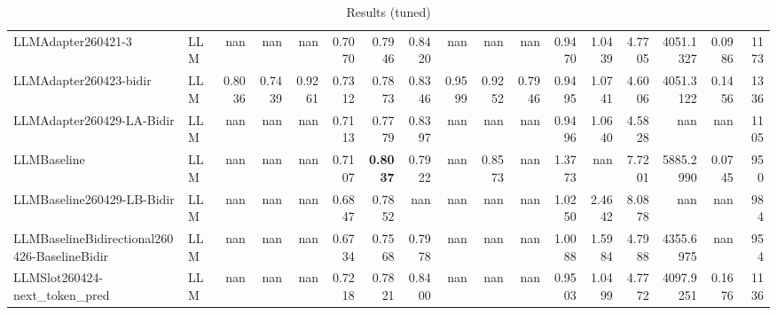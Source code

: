 \begin{table}[htbp]
{\begin{tabular}{ll|rrrrrrrrrrrrrr|r}
LLMAdapter260421-3 & LLM & nan & nan & nan & 0.7070 & 0.7946 & 0.8420 & nan & nan & nan & 0.9470 & 1.0439 & 4.7705 & 4051.1327 & 0.0986 & 1173 \\
LLMAdapter260423-bidir & LLM & 0.8036 & 0.7439 & 0.9261 & 0.7312 & 0.7873 & 0.8346 & 0.9599 & 0.9252 & 0.7946 & 0.9495 & 1.0741 & 4.6006 & 4051.3122 & 0.1456 & 1336 \\
LLMAdapter260429-LA-Bidir & LLM & nan & nan & nan & 0.7113 & 0.7779 & 0.8397 & nan & nan & nan & 0.9496 & 1.0640 & 4.5828 & nan & nan & 1105 \\
LLMBaseline & LLM & nan & nan & nan & 0.7107 & \textbf{0.8037} & 0.7922 & nan & 0.8573 & nan & 1.3773 & nan & 7.7201 & 5885.2990 & 0.0745 & 950 \\
LLMBaseline260429-LB-Bidir & LLM & nan & nan & nan & 0.6847 & 0.7852 & nan & nan & nan & nan & 1.0250 & 2.4642 & 8.0878 & nan & nan & 984 \\
LLMBaselineBidirectional260426-BaselineBidir & LLM & nan & nan & nan & 0.6734 & 0.7568 & 0.7978 & nan & nan & nan & 1.0088 & 1.5984 & 4.7988 & 4355.6975 & nan & 954 \\
LLMSlot260424-next\_token\_pred & LLM & nan & nan & nan & 0.7218 & 0.7821 & 0.8400 & nan & nan & nan & 0.9503 & 1.0499 & 4.7772 & 4097.9251 & 0.1676 & 1136 \\
\bottomrule
\end{tabular}
}
\caption{Results (tuned)}
\label{tab:results_tuned}
\end{table}